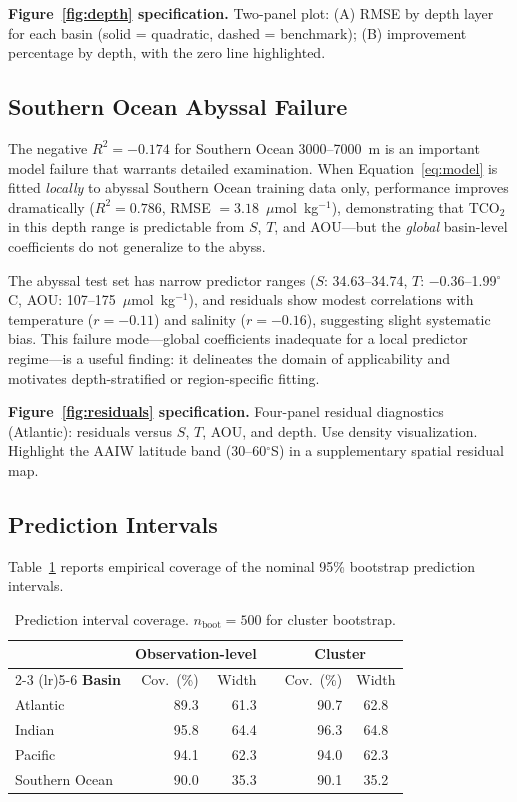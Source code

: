 \documentclass[12pt,a4paper]{article}
\begin{document}
\textbf{Figure~\ref{fig:depth} specification.} Two-panel plot: (A) RMSE by depth layer for each basin (solid = quadratic, dashed = benchmark); (B) improvement percentage by depth, with the zero line highlighted.

\subsection{Southern Ocean Abyssal Failure}
\label{sec:so_abyss}

The negative $R^2 = -0.174$ for Southern Ocean 3000--7000~m is an important model failure that warrants detailed examination. When Equation~\eqref{eq:model} is fitted \emph{locally} to abyssal Southern Ocean training data only, performance improves dramatically ($R^2 = 0.786$, RMSE $= 3.18$~$\mu$mol~kg$^{-1}$), demonstrating that TCO$_2$ in this depth range is predictable from $S$, $T$, and AOU---but the \emph{global} basin-level coefficients do not generalize to the abyss.

The abyssal test set has narrow predictor ranges ($S$: 34.63--34.74, $T$: $-0.36$--1.99$^\circ$C, AOU: 107--175~$\mu$mol~kg$^{-1}$), and residuals show modest correlations with temperature ($r = -0.11$) and salinity ($r = -0.16$), suggesting slight systematic bias. This failure mode---global coefficients inadequate for a local predictor regime---is a useful finding: it delineates the domain of applicability and motivates depth-stratified or region-specific fitting.

\textbf{Figure~\ref{fig:residuals} specification.} Four-panel residual diagnostics (Atlantic): residuals versus $S$, $T$, AOU, and depth. Use density visualization. Highlight the AAIW latitude band (30--60$^\circ$S) in a supplementary spatial residual map.

\subsection{Prediction Intervals}
\label{sec:pi_results}

Table~\ref{tab:pi} reports empirical coverage of the nominal 95\% bootstrap prediction intervals.

\begin{table}[htbp]
\centering
\caption{Prediction interval coverage. $n_{\text{boot}} = 500$ for cluster bootstrap.}
\label{tab:pi}
\begin{tabular}{l rrcrc}
\toprule
 & \multicolumn{2}{c}{\textbf{Observation-level}} & & \multicolumn{2}{c}{\textbf{Cluster}} \\
\cmidrule(lr){2-3} \cmidrule(lr){5-6}
\textbf{Basin} & Cov.\ (\%) & Width & & Cov.\ (\%) & Width \\
\midrule
Atlantic        & 89.3 & 61.3 & & 90.7 & 62.8 \\
Indian          & 95.8 & 64.4 & & 96.3 & 64.8 \\
Pacific         & 94.1 & 62.3 & & 94.0 & 62.3 \\
Southern Ocean  & 90.0 & 35.3 & & 90.1 & 35.2 \\
\bottomrule
\end{tabular}
\end{table}
\end{document}
